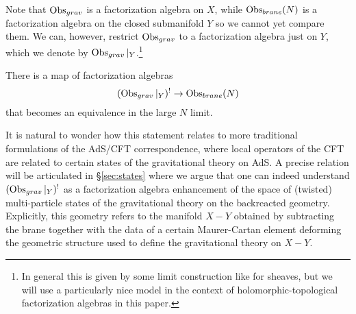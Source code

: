 Note that $\operatorname{Obs}_{grav}$ is a factorization algebra on $X$, while $\operatorname{Obs}_{brane}(N)$ is a factorization algebra on the closed submanifold $Y$ so we cannot yet compare them.
We can, however, restrict $\operatorname{Obs}_{grav}$ to a factorization algebra just on $Y$, which we denote by $\operatorname{Obs}_{grav}|_Y$.\footnote{In general this is given by some limit construction like for sheaves, but we will use a particularly nice model in the context of holomorphic-topological factorization algebras in this paper.}

\begin{expect}
There is a map of factorization algebras
\[
  (\operatorname{Obs}_{grav}|_{Y})^{!}\to \operatorname{Obs}_{brane}(N)
\]
that becomes an equivalence in the large $N$ limit.
\end{expect}

It is natural to wonder how this statement relates to more traditional formulations of the AdS/CFT correspondence, where local operators of the CFT are related to certain states of the gravitational theory on AdS. A precise relation will be articulated in \S\ref{sec:states} where we argue that one can indeed understand $(\operatorname{Obs}_{grav}|_{Y})^{!}$ as a factorization algebra enhancement of the space of (twisted) multi-particle states of the gravitational theory on the backreacted geometry. Explicitly, this geometry refers to the manifold $X - Y$ obtained by subtracting the brane together with the data of a certain Maurer-Cartan element deforming the geometric structure used to define the gravitational theory on $X - Y$.

